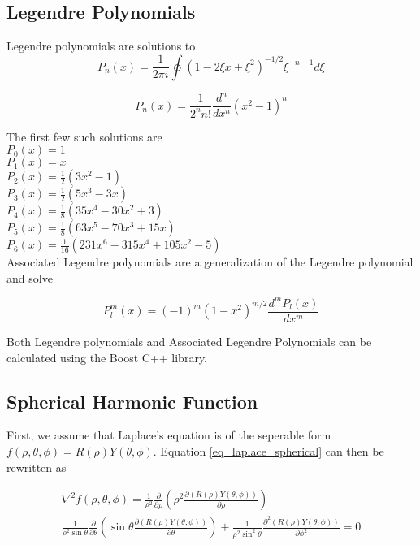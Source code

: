 \documentclass{article}
\numberwithin{equation}{subsection}
\begin{document}
\subsection{Legendre Polynomials} \label{sec_legendre}

Legendre polynomials are solutions to
\begin{equation}
P_n(x) = \frac{1}{2 \pi i} \oint (1-2\xi x + \xi^2)^{-1/2} \xi^{-n-1} d\xi
\end{equation}

\begin{equation}
P_n(x) = \frac{1}{2^n n!}\frac{d^n}{dx^n}(x^2-1)^n
\end{equation}

The first few such solutions are \\
$P_0(x) = 1$ \\
$P_1(x) = x$ \\
$P_2(x) = \frac{1}{2}(3x^2-1)$ \\
$P_3(x) = \frac{1}{2}(5x^3 - 3x)$ \\
$P_4(x) = \frac{1}{8}(35x^4 - 30x^2 + 3)$ \\
$P_5(x) = \frac{1}{8}(63x^5 - 70x^3 + 15x)$ \\
$P_6(x) = \frac{1}{16}(231x^6 - 315x^4 + 105x^2 - 5)$ \\

Associated Legendre polynomials are a generalization of the Legendre polynomial and solve 

\begin{equation}
P_l^m(x) = (-1)^m(1-x^2)^{m/2}\frac{d^m P_l(x)}{dx^m}
\end{equation}

Both Legendre polynomials and Associated Legendre Polynomials can be calculated using the Boost C++ library.

\subsection{Spherical Harmonic Function}

First, we assume that Laplace's equation is of the seperable form $f(\rho, \theta, \phi) = R(\rho)Y(\theta, \phi)$. Equation \ref{eq_laplace_spherical} can then be rewritten as

\begin{equation} \label{eq_spherical1}
\begin{split}
\nabla^2 f(\rho, \theta, \phi) = 
\frac{1}{\rho^2}
\frac{\partial}{\partial \rho} 
\left( \rho^2 \frac{\partial (R(\rho)Y(\theta, \phi))}{\partial \rho}\right) 
+ \\
\frac{1}{\rho^2 \sin \theta}
\frac{\partial}{\partial \theta}
\left( \sin \theta \frac{\partial (R(\rho)Y(\theta, \phi))}{\partial \theta}\right) 
+ 
\frac{1}{\rho^2 \sin^2 \theta} 
\frac{\partial^2 (R(\rho)Y(\theta, \phi))}{\partial \phi^2} = 0
\end{split}
\end{equation}
\end{document}
